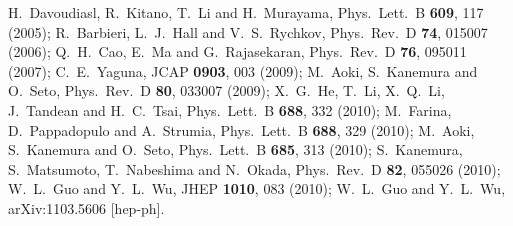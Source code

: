 \documentclass[aps,prd,preprint,nofootinbib]{revtex4}
\begin{document}
\begin{thebibliography}{99}
  H.~Davoudiasl, R.~Kitano, T.~Li and H.~Murayama,
  Phys.\ Lett.\  B {\bf 609}, 117 (2005);
  R.~Barbieri, L.~J.~Hall and V.~S.~Rychkov,
  Phys.\ Rev.\  D {\bf 74}, 015007 (2006);
  Q.~H.~Cao, E.~Ma and G.~Rajasekaran,
  Phys.\ Rev.\  D {\bf 76}, 095011 (2007);
  C.~E.~Yaguna,
  JCAP {\bf 0903}, 003 (2009);
  M.~Aoki, S.~Kanemura and O.~Seto,
  Phys.\ Rev.\  D {\bf 80}, 033007 (2009);
  X.~G.~He, T.~Li, X.~Q.~Li, J.~Tandean and H.~C.~Tsai,
  Phys.\ Lett.\  B {\bf 688}, 332 (2010);
  M.~Farina, D.~Pappadopulo and A.~Strumia,
  Phys.\ Lett.\  B {\bf 688}, 329 (2010);
  M.~Aoki, S.~Kanemura and O.~Seto,
  Phys.\ Lett.\  B {\bf 685}, 313 (2010);
  S.~Kanemura, S.~Matsumoto, T.~Nabeshima and N.~Okada,
  Phys.\ Rev.\  D {\bf 82}, 055026 (2010);
  W.~L.~Guo and Y.~L.~Wu,
  JHEP {\bf 1010}, 083 (2010);
  W.~L.~Guo and Y.~L.~Wu,
  arXiv:1103.5606 [hep-ph].



\end{thebibliography}
\end{document}
